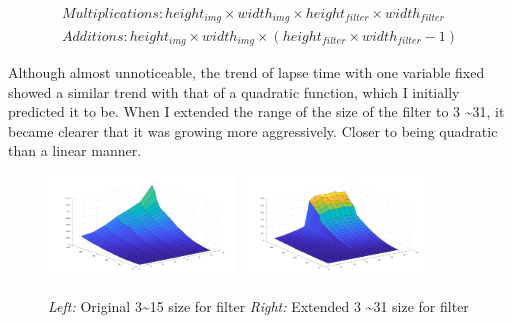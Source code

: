     \begin{align*}
        Multiplications: height_{img} \times width_{img} \times height_{filter} \times width_{filter} \\
        Additions: height_{img} \times width_{img} \times (height_{filter} \times width_{filter} - 1)
    \end{align*}

    Although almost unnoticeable, the trend of lapse time with one variable fixed showed a similar trend with that of a quadratic function, which I initially predicted it to be. When I extended the range of the size of the filter to 3 \textasciitilde31, it became clearer that it was growing more aggressively. Closer to being quadratic than a linear manner.

    \begin{figure}[h]
        \centering
        \includegraphics[width=5cm]{q4.jpg}
        \includegraphics[width=5cm]{q4_extended.jpg}
        \caption{\emph{Left:} Original 3\textasciitilde15 size for filter \emph{Right:} Extended 3 \textasciitilde31 size for filter}
    \end{figure}




